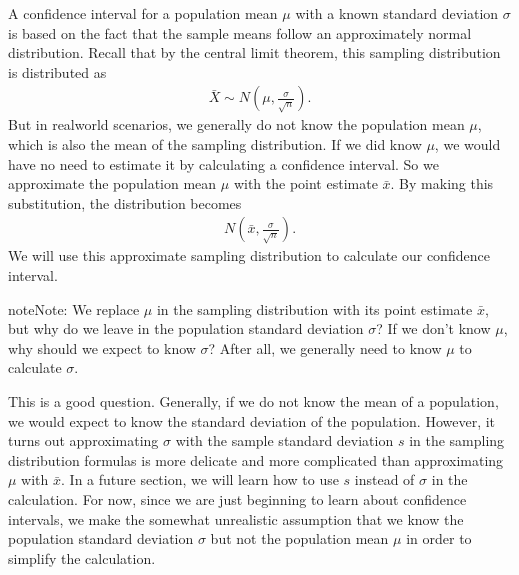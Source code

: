 \documentclass[letterpaper,10pt,english]{jupyterBook}
\begin{document}
\sphinxAtStartPar
A confidence interval for a population mean \(\mu\) with a known standard deviation \(\sigma\) is based on the fact that the sample means follow an approximately normal distribution. Recall that by the central limit theorem, this sampling distribution is distributed as
\begin{equation*}
\begin{split} \bar{X} \sim N\left(\mu, \frac{\sigma}{\sqrt{n}}\right). \end{split}
\end{equation*}
\sphinxAtStartPar
But in real\sphinxhyphen{}world scenarios, we generally do not know the population mean \(\mu\), which is also the mean of the sampling distribution. If we did know \(\mu\), we would have no need to estimate it by calculating a confidence interval. So we approximate the population mean \(\mu\) with the point estimate \(\bar{x}\). By making this substitution, the distribution becomes
\begin{equation*}
\begin{split}N\left(\bar{x}, \frac{\sigma}{\sqrt{n}}\right).\end{split}
\end{equation*}
\sphinxAtStartPar
We will use this approximate sampling distribution to calculate our confidence interval.

\begin{sphinxadmonition}{note}{Note:}
\sphinxAtStartPar
We replace \(\mu\) in the sampling distribution with its point estimate \(\bar{x}\), but why do we leave in the population standard deviation \(\sigma\)? If we don’t know \(\mu\), why should we expect to know \(\sigma\)? After all, we generally need to know \(\mu\) to calculate \(\sigma\).

\sphinxAtStartPar
This is a good question. Generally, if we do not know the mean of a population, we would  expect to know the standard deviation of the population. However, it turns out approximating \(\sigma\) with the sample standard deviation \(s\) in the sampling distribution formulas is more delicate and more complicated than approximating \(\mu\) with \(\bar{x}\). In a future section, we will learn how to use \(s\) instead of \(\sigma\) in the calculation. For now, since we are just beginning to learn about confidence intervals, we make the somewhat unrealistic assumption that we know the population standard deviation \(\sigma\) but not the population mean \(\mu\) in order to simplify the calculation.
\end{sphinxadmonition}
\end{document}
